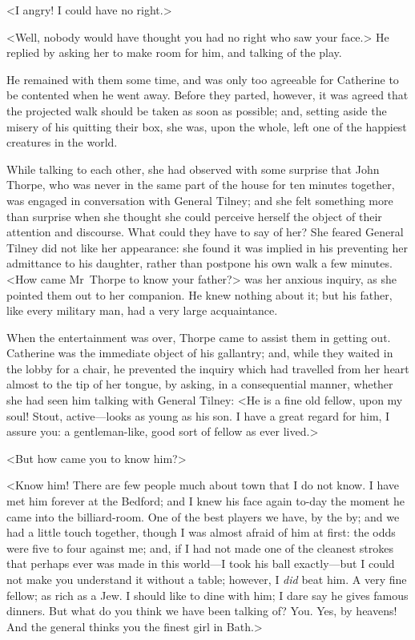  <I angry! I could have no right.> 

 <Well, nobody would have thought you had no right who saw your face.> He replied by asking her to make room for him, and talking of the play. 

 He remained with them some time, and was only too agreeable for Catherine to be contented when he went away. Before they parted, however, it was agreed that the projected walk should be taken as soon as possible; and, setting aside the misery of his quitting their box, she was, upon the whole, left one of the happiest creatures in the world. 

 While talking to each other, she had observed with some surprise that John Thorpe, who was never in the same part of the house for ten minutes together, was engaged in conversation with General Tilney; and she felt something more than surprise when she thought she could perceive herself the object of their attention and discourse. What could they have to say of her? She feared General Tilney did not like her appearance: she found it was implied in his preventing her admittance to his daughter, rather than postpone his own walk a few minutes. <How came Mr~Thorpe to know your father?> was her anxious inquiry, as she pointed them out to her companion. He knew nothing about it; but his father, like every military man, had a very large acquaintance. 

 When the entertainment was over, Thorpe came to assist them in getting out. Catherine was the immediate object of his gallantry; and, while they waited in the lobby for a chair, he prevented the inquiry which had travelled from her heart almost to the tip of her tongue, by asking, in a consequential manner, whether she had seen him talking with General Tilney: <He is a fine old fellow, upon my soul! Stout, active—looks as young as his son. I have a great regard for him, I assure you: a gentleman-like, good sort of fellow as ever lived.> 

 <But how came you to know him?> 

 <Know him! There are few people much about town that I do not know. I have met him forever at the Bedford; and I knew his face again to-day the moment he came into the billiard-room. One of the best players we have, by the by; and we had a little touch together, though I was almost afraid of him at first: the odds were five to four against me; and, if I had not made one of the cleanest strokes that perhaps ever was made in this world—I took his ball exactly—but I could not make you understand it without a table; however, I \textit{did} beat him. A very fine fellow; as rich as a Jew. I should like to dine with him; I dare say he gives famous dinners. But what do you think we have been talking of? You. Yes, by heavens! And the general thinks you the finest girl in Bath.> 

